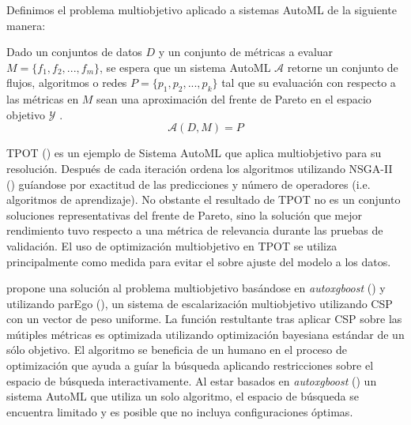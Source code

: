 Definimos el problema multiobjetivo aplicado a sistemas AutoML de la siguiente manera:
\begin{definition}\label{background:def:moo-automl-problem}
    Dado un conjuntos de datos $D$ y  un conjunto de m\'etricas a evaluar $M = \{f_1, f_2, ...,f_m\}$, se espera que  un sistema AutoML $\mathcal{A}$ retorne un conjunto de flujos, algoritmos o redes $P = \{p_1, p_2, ..., p_k\}$ tal que su evaluaci\'on con respecto a las m\'etricas en $M$ sean una aproximaci\'on del frente de Pareto en el espacio objetivo $\mathcal{Y}$ .
    \begin{equation*}
        \mathcal{A}(D, M) = P  
    \end{equation*}
\end{definition}

TPOT (\cite{pmlr-v64-olson_tpot_2016}) es un ejemplo de Sistema AutoML que aplica multiobjetivo para su resoluci\'on. Despu\'es de cada iteraci\'on ordena los algoritmos utilizando NSGA-II (\cite{deb2002fast}) gu\'iandose por exactitud de las predicciones y n\'umero de operadores (i.e. algoritmos de aprendizaje). No obstante el resultado de TPOT no es un conjunto soluciones representativas del frente de Pareto, sino la soluci\'on que mejor rendimiento tuvo respecto a una m\'etrica de relevancia durante las pruebas de validaci\'on. El uso de optimizaci\'on multiobjetivo en TPOT se utiliza principalmente como medida para evitar el sobre ajuste del modelo a los datos.

\cite{pfisterer2019multi} propone una soluci\'on al problema multiobjetivo bas\'andose en \textit{autoxgboost} (\cite{thomas2018automatic}) y utilizando  parEgo (\cite{knowles2006parego}), un sistema de escalarizaci\'on multiobjetivo utilizando CSP con un vector de peso uniforme. La funci\'on restultante tras aplicar CSP sobre las m\'utiples m\'etricas  es optimizada utilizando optimizaci\'on bayesiana est\'andar de un s\'olo objetivo.
El algoritmo se beneficia de un humano en el proceso de optimizaci\'on que ayuda a gu\'iar la b\'usqueda aplicando restricciones sobre el espacio de b\'usqueda interactivamente.
Al estar basados en \textit{autoxgboost} (\cite{thomas2018automatic}) un sistema AutoML que utiliza un solo algoritmo, el espacio de b\'usqueda se encuentra limitado y es posible que no incluya configuraciones \'optimas.


